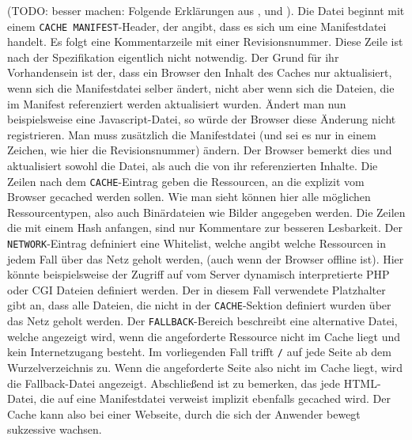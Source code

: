 (TODO: besser machen: Folgende Erklärungen aus \cite{W3C2012}, \cite{html5upandrunningchapter8} und \cite{Bidelman2010}). Die Datei beginnt mit einem \texttt{CACHE MANIFEST}-Header, der angibt, dass es sich um eine Manifestdatei handelt. Es folgt eine Kommentarzeile mit einer Revisionsnummer. Diese Zeile ist nach der Spezifikation eigentlich nicht notwendig. Der Grund für ihr Vorhandensein ist der, dass ein Browser den Inhalt des Caches nur aktualisiert, wenn sich die Manifestdatei selber ändert, nicht aber wenn sich die Dateien, die im Manifest referenziert werden aktualisiert wurden. Ändert man nun beispielsweise eine Javascript-Datei, so würde der Browser diese Änderung nicht registrieren. Man muss zusätzlich die Manifestdatei (und sei es nur in einem Zeichen, wie hier die Revisionsnummer) ändern. Der Browser bemerkt dies und aktualisiert sowohl die Datei, als auch die von ihr referenzierten Inhalte. Die Zeilen nach dem \texttt{CACHE}-Eintrag geben die Ressourcen, an die explizit vom Browser gecached werden sollen. Wie man sieht können hier alle möglichen Ressourcentypen, also auch Binärdateien wie Bilder angegeben werden. Die Zeilen die mit einem Hash anfangen, sind nur Kommentare zur besseren Lesbarkeit. Der \texttt{NETWORK}-Eintrag defniniert eine Whitelist, welche angibt welche Ressourcen in jedem Fall über das Netz geholt werden, (auch wenn der Browser offline ist). Hier könnte beispielsweise der Zugriff auf vom Server dynamisch interpretierte PHP oder CGI Dateien definiert werden. Der in diesem Fall verwendete Platzhalter gibt an, dass alle Dateien, die nicht in der \texttt{CACHE}-Sektion definiert wurden über das Netz geholt werden. Der \texttt{FALLBACK}-Bereich beschreibt eine alternative Datei, welche angezeigt wird, wenn die angeforderte Ressource nicht im Cache liegt und kein Internetzugang besteht. Im vorliegenden Fall trifft \texttt{/} auf jede Seite ab dem Wurzelverzeichnis zu. Wenn die angeforderte Seite also nicht im Cache liegt, wird die Fallback-Datei angezeigt. Abschließend ist zu bemerken, das jede HTML-Datei, die auf eine Manifestdatei verweist implizit ebenfalls gecached wird. Der Cache kann also bei einer Webseite, durch die sich der Anwender bewegt sukzessive wachsen.

